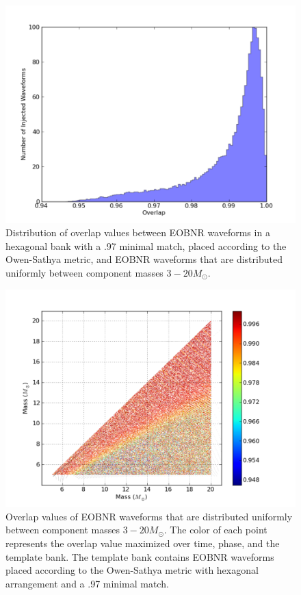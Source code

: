 \documentclass[aps,
prd,
amsmath,
amssymb,
twocolumn,
floatfix,
groupedaddress]{revtex4-1}
\begin{document}
\begin{figure}
\includegraphics[scale=0.04, clip=false, totalheight=0.3\textheight]{eobnr-hist.pdf}
\caption{\label{fig:eobnr-hist}Distribution of overlap values between EOBNR waveforms in a hexagonal bank with a .97 minimal match, placed according to the Owen-Sathya metric, and EOBNR waveforms that are distributed uniformly between 
component masses $3 -20 M_{\odot}$.}
\end{figure}

\begin{figure}
\includegraphics[scale=0.04, clip=false, totalheight=0.3\textheight]{eobnr-bank.pdf}
\caption{\label{fig:eobnr-bank}Overlap values of EOBNR waveforms that are distributed uniformly between component  masses $3 -20 M_{\odot}$. The color of each point represents the overlap value maximized over time, phase, and the template bank. The template bank contains EOBNR waveforms placed according to the Owen-Sathya metric with hexagonal
  arrangement and a .97 minimal match.}
\end{figure}
\end{document}
